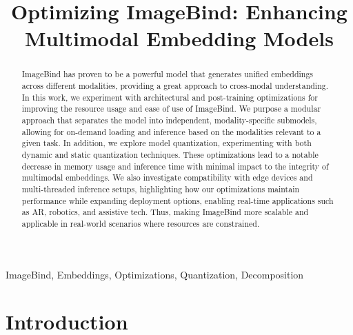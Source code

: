 \documentclass[runningheads]{IEEEtran}
\begin{document}
\title{Optimizing ImageBind: Enhancing Multimodal Embedding Models}
\author{}
\maketitle


\begin{abstract}
ImageBind has proven to be a powerful model that generates unified embeddings across different modalities, providing a great approach to cross-modal understanding. In this work, we experiment with architectural and post-training optimizations for improving the resource usage and ease of use of ImageBind. We purpose a modular approach that separates the model into independent, modality-specific submodels, allowing for on-demand loading and inference based on the modalities relevant to a given task. In addition, we explore model quantization, experimenting with both dynamic and static quantization techniques. These optimizations lead to a notable decrease in memory usage and inference time with minimal impact to the integrity of multimodal embeddings. We also investigate compatibility with edge devices and multi-threaded inference setups, highlighting how our optimizations maintain performance while expanding deployment options, enabling real-time applications such as AR, robotics, and assistive tech. Thus, making ImageBind more scalable and applicable in real-world scenarios where resources are constrained.
\end{abstract}

\begin{IEEEkeywords}
ImageBind, Embeddings, Optimizations, Quantization, Decomposition
\end{IEEEkeywords}


\section{Introduction}
\end{document}
